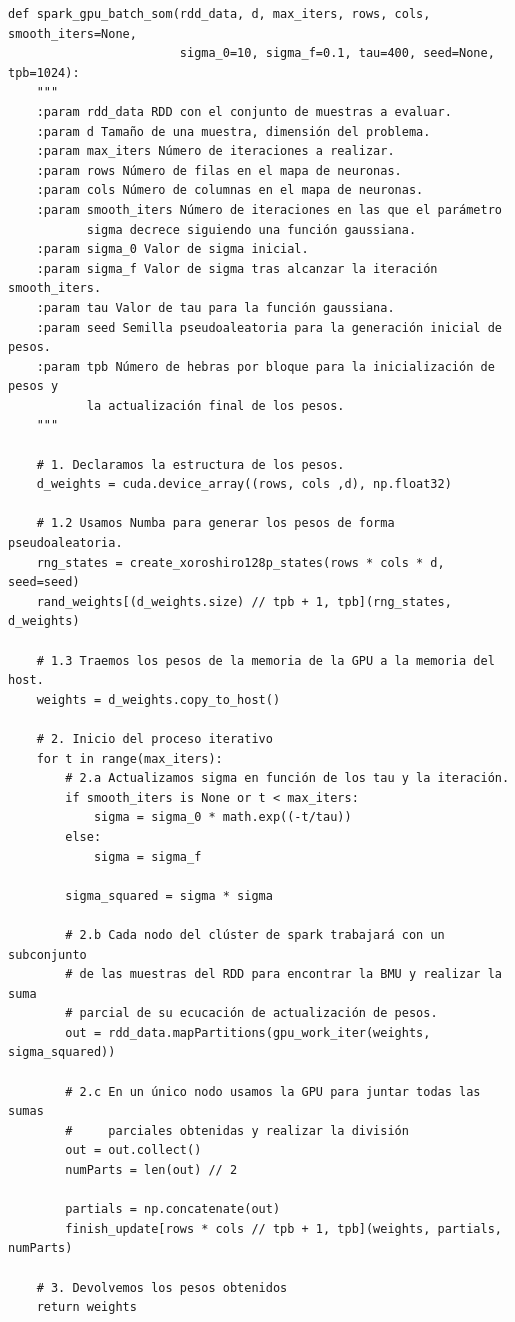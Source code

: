 \begin{code}
\begin{verbatim}
def spark_gpu_batch_som(rdd_data, d, max_iters, rows, cols, smooth_iters=None,
                        sigma_0=10, sigma_f=0.1, tau=400, seed=None, tpb=1024):
    """
    :param rdd_data RDD con el conjunto de muestras a evaluar.
    :param d Tamaño de una muestra, dimensión del problema.
    :param max_iters Número de iteraciones a realizar.
    :param rows Número de filas en el mapa de neuronas.
    :param cols Número de columnas en el mapa de neuronas.
    :param smooth_iters Número de iteraciones en las que el parámetro
           sigma decrece siguiendo una función gaussiana. 
    :param sigma_0 Valor de sigma inicial.
    :param sigma_f Valor de sigma tras alcanzar la iteración smooth_iters.
    :param tau Valor de tau para la función gaussiana.
    :param seed Semilla pseudoaleatoria para la generación inicial de pesos.
    :param tpb Número de hebras por bloque para la inicialización de pesos y
           la actualización final de los pesos.
    """
    
    # 1. Declaramos la estructura de los pesos.
    d_weights = cuda.device_array((rows, cols ,d), np.float32)

    # 1.2 Usamos Numba para generar los pesos de forma pseudoaleatoria.
    rng_states = create_xoroshiro128p_states(rows * cols * d, seed=seed)
    rand_weights[(d_weights.size) // tpb + 1, tpb](rng_states, d_weights)
     
    # 1.3 Traemos los pesos de la memoria de la GPU a la memoria del host.
    weights = d_weights.copy_to_host()

    # 2. Inicio del proceso iterativo
    for t in range(max_iters):
        # 2.a Actualizamos sigma en función de los tau y la iteración.
        if smooth_iters is None or t < max_iters:
            sigma = sigma_0 * math.exp((-t/tau))
        else:
            sigma = sigma_f
            
        sigma_squared = sigma * sigma
        
        # 2.b Cada nodo del clúster de spark trabajará con un subconjunto
        # de las muestras del RDD para encontrar la BMU y realizar la suma
        # parcial de su ecucación de actualización de pesos.
        out = rdd_data.mapPartitions(gpu_work_iter(weights, sigma_squared))
        
        # 2.c En un único nodo usamos la GPU para juntar todas las sumas 
        #     parciales obtenidas y realizar la división
        out = out.collect()
        numParts = len(out) // 2

        partials = np.concatenate(out)
        finish_update[rows * cols // tpb + 1, tpb](weights, partials, numParts)
       
    # 3. Devolvemos los pesos obtenidos
    return weights
\end{verbatim}
\label{code:somspark}
\end{code}

